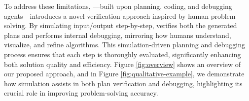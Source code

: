 To address these limitations, \toolnospace—built upon planning, coding, and debugging agents—introduces a novel verification approach inspired by human problem-solving. By simulating input/output step-by-step, \tool verifies both the generated plans and performs internal debugging, mirroring how humans understand, visualize, and refine algorithms. This simulation-driven planning and debugging process ensures that each step is thoroughly evaluated, significantly enhancing both solution quality and efficiency. Figure \ref{fig:overview} shows an overview of our proposed approach, \tool and in Figure \ref{fig:qualitative-example}, we demonstrate how simulation assists in both plan verification and debugging, highlighting its crucial role in improving problem-solving accuracy. 













